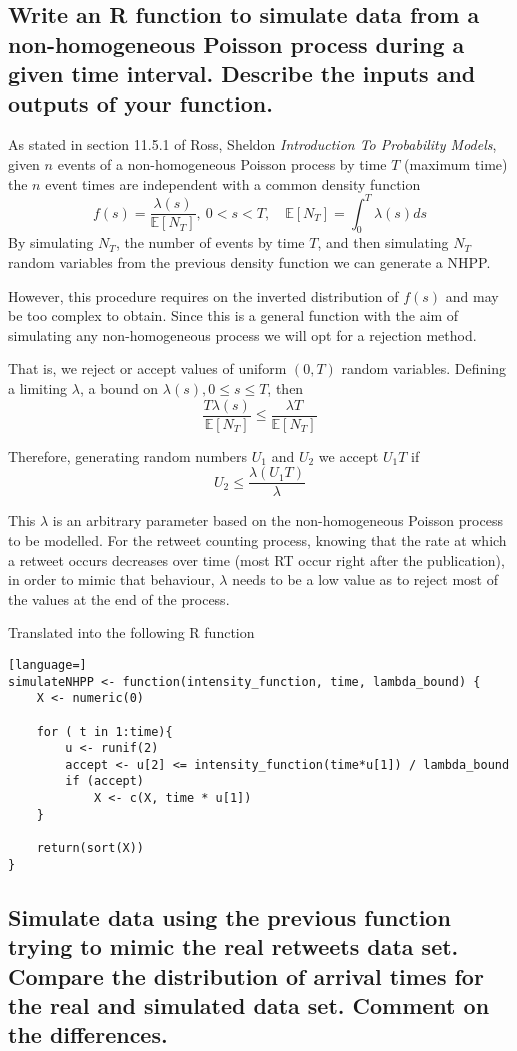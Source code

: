 \subsection{Write an R function to simulate data from a non-homogeneous Poisson process during a given time interval. Describe the inputs and outputs of your function.}

As stated in section 11.5.1 of Ross, Sheldon \textit{Introduction To Probability Models}, given $n$ events of a non-homogeneous Poisson process by time $T$ (maximum time) the $n$ event times are independent with a common density function
\[f(s) = \frac{\lambda(s)}{\mathbb{E}[N_T]},\ 0<s<T, \quad \mathbb{E}[N_T] = \int^T_0\lambda(s)ds\]
By simulating $N_T$, the number of events by time $T$, and then simulating $N_T$ random variables from the previous density function we can generate a NHPP.

However, this procedure requires on the inverted distribution of $f(s)$  and may be too complex to obtain. Since this is a general function with the aim of simulating any non-homogeneous process we will opt for a rejection method.

That is, we reject or accept values of uniform $(0, T)$ random variables. Defining a limiting $\lambda$, a bound on $\lambda(s), 0\leq s \leq T$, then 
\[\frac{T \lambda(s)}{\mathbb{E}[N_T]} \leq \frac{\lambda T}{\mathbb{E}[N_T]} \]

Therefore, generating random numbers $U_1$ and $U_2$ we accept $U_1T$ if
\[U_2 \leq \frac{\lambda(U_1T)}{\lambda}\]

This $\lambda$ is an arbitrary parameter based on the non-homogeneous Poisson process to be modelled. For the retweet counting process, knowing that the rate at which a retweet occurs decreases over time (most RT occur right after the publication), in order to mimic that behaviour, $\lambda$ needs to be a low value as to reject most of the values at the end of the process.

Translated into the following R function
\begin{lstlisting}[language=]
simulateNHPP <- function(intensity_function, time, lambda_bound) {
	X <- numeric(0)
	
	for ( t in 1:time){
		u <- runif(2)
		accept <- u[2] <= intensity_function(time*u[1]) / lambda_bound
		if (accept)
			X <- c(X, time * u[1])
	}
		
	return(sort(X))
}
\end{lstlisting}

\subsection{Simulate data using the previous function trying to mimic the real retweets data set. Compare the distribution of arrival times for the real and simulated data set. Comment on the differences.}

